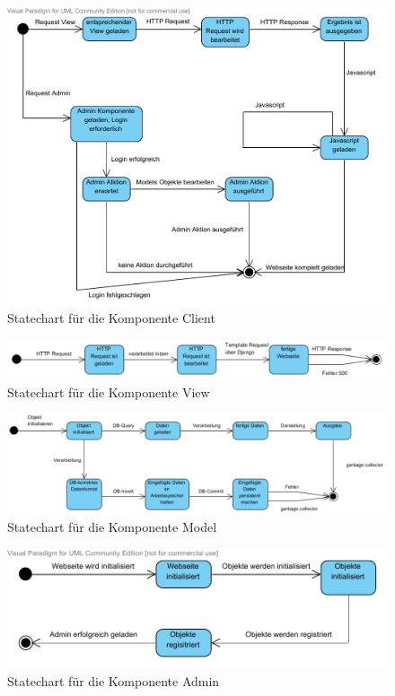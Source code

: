\begin{figure}
\includegraphics[width=0.8\linewidth]{bilder/KompClient.pdf}
\caption{Statechart für die Komponente Client}
\label{StClient}
\end{figure}

\begin{figure}
\includegraphics[width=0.8\linewidth]{bilder/KompView.pdf}
\caption{Statechart für die Komponente View}
\label{StView}
\end{figure}

\begin{figure}
\includegraphics[width=0.8\linewidth]{bilder/KompModel.pdf}
\caption{Statechart für die Komponente Model}
\label{StModel}
\end{figure}

\begin{figure}
\includegraphics[width=0.8\linewidth]{bilder/KompAdmin.pdf}
\caption{Statechart für die Komponente Admin}
\label{StAdmin}
\end{figure}

